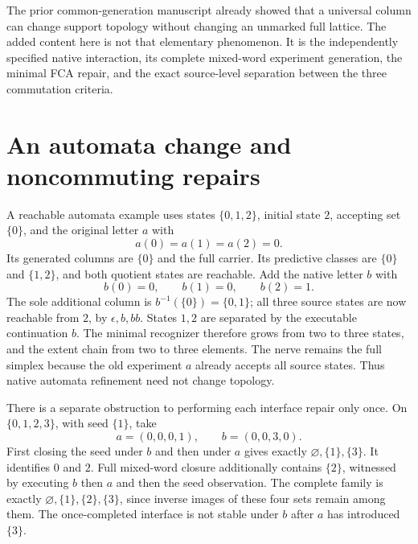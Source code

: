 \documentclass[11pt]{article}
\theoremstyle{remark}\newtheorem{remark}[theorem]{Remark}
\begin{document}
The prior common-generation manuscript already showed that a universal
column can change support topology without changing an unmarked full
lattice. The added content here is not that elementary phenomenon.
It is the independently specified native interaction, its complete
mixed-word experiment generation, the minimal FCA repair, and the
exact source-level separation between the three commutation criteria.

\section{An automata change and noncommuting repairs}
A reachable automata example uses states $\{0,1,2\}$, initial state $2$,
accepting set $\{0\}$, and the original letter $a$ with
\[
 a(0)=a(1)=a(2)=0.
\]
Its generated columns are $\{0\}$ and the full carrier. Its predictive
classes are $\{0\}$ and $\{1,2\}$, and both quotient states are
reachable. Add the native letter $b$ with
\[
 b(0)=0,\qquad b(1)=0,\qquad b(2)=1.
\]
The sole additional column is $b^{-1}(\{0\})=\{0,1\}$;
all three source states are now reachable from $2$, by $\epsilon,b,bb$.
States $1,2$ are separated by the executable continuation $b$.
The minimal recognizer therefore grows from two to three states, and
the extent chain from two to three elements. The nerve remains the
full simplex because the old experiment $a$ already accepts all source
states. Thus native automata refinement need not change topology.

There is a separate obstruction to performing each interface repair
only once. On $\{0,1,2,3\}$, with seed $\{1\}$, take
\[
 a=(0,0,0,1),\qquad b=(0,0,3,0).
\]
First closing the seed under $b$ and then under $a$ gives exactly
$\varnothing,\{1\},\{3\}$. It identifies $0$ and $2$.
Full mixed-word closure additionally contains $\{2\}$, witnessed by
executing $b$ then $a$ and then the seed observation. The complete
family is exactly $\varnothing,\{1\},\{2\},\{3\}$, since inverse
images of these four sets remain among them. The once-completed
interface is not stable under $b$ after $a$ has introduced $\{3\}$.
\end{document}
